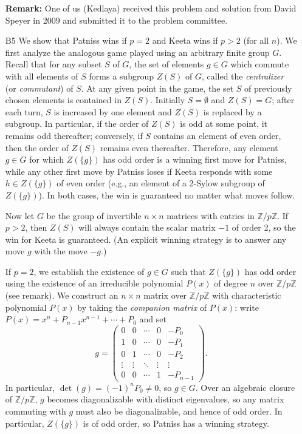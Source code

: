 \documentclass[amssymb,twocolumn,pra,10pt,aps]{revtex4-1}
\newcommand{\ZZ}{\mathbb{Z}}
\begin{document}
\begin{itemize}
\noindent
\textbf{Remark:} One of us (Kedlaya) received this problem and solution from David Speyer in 2009 and submitted it to the problem committee.

\item[B5]
We show that Patniss wins if $p=2$ and Keeta wins if $p>2$ (for all $n$).
We first analyze the analogous game played using an arbitrary finite group $G$.
Recall that for any subset $S$ of $G$, the set of elements $g \in G$ which commute with all elements of $S$ forms a subgroup $Z(S)$ of $G$, called the \emph{centralizer} (or \emph{commutant}) of $S$. 
At any given point in the game, the set $S$ of previously chosen elements is contained in $Z(S)$. Initially $S = \emptyset$ and $Z(S) = G$;
after each turn, $S$ is increased by one element and $Z(S)$ is replaced by a subgroup.
In particular, if the order of $Z(S)$ is odd at some point, it remains odd thereafter;
conversely, if $S$ contains an element of even order, then the order of $Z(S)$ remains even thereafter. Therefore, any element $g \in G$ for which $Z(\{g\})$ has odd order is a winning first move for Patniss, while any other first move by Patniss loses if Keeta responds with some $h \in Z(\{g\})$ of even order (e.g., an element of a 2-Sylow subgroup of $Z(\{g\})$). In both cases, the win is guaranteed no matter what moves follow.

Now let $G$ be the group of invertible $n \times n$ matrices with entries in $\ZZ/p\ZZ$.
If $p>2$, then $Z(S)$ will always contain the scalar matrix $-1$ of order 2, so the win for Keeta is guaranteed. (An explicit winning strategy is to answer any move $g$ with the move $-g$.)

If $p=2$, we establish the existence of $g \in G$ such that $Z(\{g\})$ has odd order
using the existence of an irreducible polynomial $P(x)$ of degree $n$ over $\ZZ/p\ZZ$ (see remark). We construct an $n \times n$ matrix over $\ZZ/p\ZZ$ with characteristic polynomial $P(x)$ by taking the \emph{companion matrix} of $P(x)$: write $P(x) = x^n + P_{n-1} x^{n-1} + \cdots + P_0$ and set
\[
g = \begin{pmatrix}
0 & 0 & \cdots & 0 & -P_0 \\
1 & 0 & \cdots & 0 & -P_1 \\
0 & 1 & \cdots & 0 & -P_2 \\
\vdots & \vdots & \ddots & \vdots & \vdots \\
0 & 0 & \cdots & 1 & -P_{n-1}
\end{pmatrix}.
\]
In particular, $\det(g) = (-1)^n P_0 \neq 0$, so $g \in G$.
Over an algebraic closure of $\ZZ/p \ZZ$, $g$ becomes diagonalizable with distinct eigenvalues, so any matrix commuting with $g$ must also be diagonalizable, and hence of odd order. In particular, $Z(\{g\})$ is of odd order, so Patniss has a winning strategy.


\end{itemize}
\end{document}
